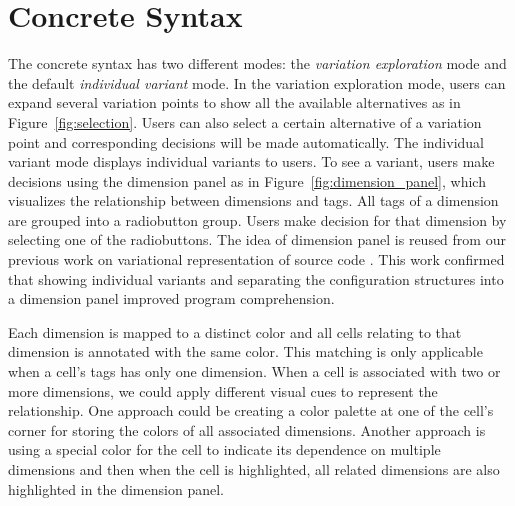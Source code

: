 \documentclass[conference]{IEEEtran}
\begin{document}
\section{Concrete Syntax}
\label{sec:concsyntax}

The concrete syntax has two different modes: the \emph{variation exploration} mode and the default \emph{individual variant} mode.
In the variation exploration mode, users can expand several variation points to show all the available alternatives as
in Figure~\ref{fig:selection}. Users can also select a certain alternative of a variation point and corresponding decisions 
will be made automatically. The individual variant mode displays individual variants to users. 
To see a variant, users make decisions using the dimension panel as in
Figure~\ref{fig:dimension_panel}, which visualizes the relationship between dimensions and tags.
All tags of a dimension are grouped into a radiobutton group.
Users make decision for that dimension by selecting one of the radiobuttons.
The idea of dimension panel is reused from our previous work on variational representation of source code \cite{le2011}.
This work confirmed that showing individual variants and separating the configuration structures into a dimension panel improved program comprehension.

Each dimension is mapped to a distinct color and all cells relating to that dimension is annotated with
the same color.
This matching is only applicable when a cell's tags has only one dimension.
When a cell is associated with two or more dimensions, we could apply different visual cues to represent the relationship.
One approach could be creating a color palette at one of the cell's corner for storing the colors of all associated dimensions. Another approach is using a special color for the cell to indicate its dependence on multiple dimensions
and then when the cell is highlighted, all related dimensions are also highlighted in the dimension panel.
\end{document}
